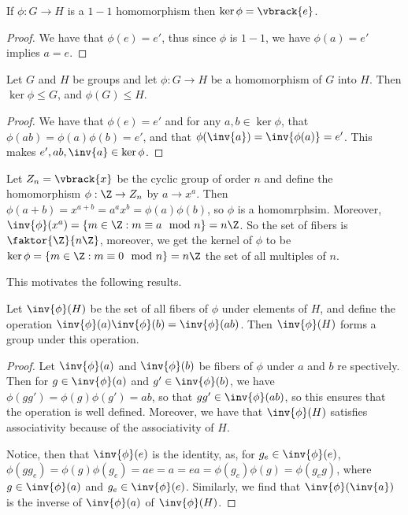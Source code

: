\begin{lemma}\label{3.1.1}
    If $\phi:G \rightarrow H$ is a $1-1$ homomorphism then $\ker{\phi}=\vbrack{e}$.
\end{lemma}
\begin{proof}
    We have that $\phi(e)=e'$, thus since $\phi$ is $1-1$, we have $\phi(a)=e'$
    implies $a=e$.
\end{proof}

\begin{lemma}\label{3.1.2}
    Let $G$ and  $H$ be groups and let  $\phi:G \rightarrow H$ be a homomorphism
    of $G$ into  $H$. Then $\ker{\phi} \leq G$, and $\phi(G) \leq H$.
\end{lemma}
\begin{proof}
    We have that $\phi(e)=e'$ and for any $a,b \in \ker{\phi}$, that
    $\phi(ab)=\phi(a)\phi(b)=e'$, and that $\phi(\inv{a})=\inv{\phi(a)}=e'$.
    This makes $e',ab, \inv{a} \in \ker{\phi}$.
\end{proof}

\begin{example}\label{3.1}
    Let $Z_n=\vbrack{x}$ be the cyclic group of order $n$ and define the
    homomorphism  $\phi:\Z \rightarrow Z_n$ by $a \rightarrow x^a$. Then
    $\phi(a+b)=x^{a+b}=a^ax^b=\phi(a)\phi(b)$, so $\phi$ is a homomrphsim.
    Moreover,  $\inv{\phi}(x^a)=\{m \in \Z : m \equiv a \mod{n}\}=n\Z$. So the
    set of fibers is $\faktor{\Z}{n\Z}$, moreover, we get the kernel of $\phi$
    to be  $\ker{\phi}=\{m \in \Z : m \equiv 0 \mod{n}\}=n\Z$ the set of all
    multiples of $n$.
\end{example}

This motivates the following results.

\begin{theorem}\label{3.1.3}
    Let $\inv{\phi}(H)$ be the set of all fibers of $\phi$ under elements of
    $H$, and define the operation $\inv{\phi}(a)\inv{\phi}(b)=\inv{\phi}(ab)$.
    Then $\inv{\phi}(H)$ forms a group under this operation.
\end{theorem}
\begin{proof}
    Let $\inv{\phi}(a)$ and $\inv{\phi}(b)$ be fibers of  $\phi$ under  $a$ and
     $b$ re spectively. Then for $g \in \inv{\phi}(a)$ and  $g' \in
     \inv{\phi}(b)$, we have  $\phi(gg')=\phi(g)\phi(g')=ab$, so that $gg' \in
     \inv{\phi}(ab)$, so this ensures that the operation is well defined.
     Moreover, we have that $\inv{\phi}(H)$ satisfies associativity because of
     the associativity of  $H$.

     Notice, then that  $\inv{\phi}(e)$ is the identity, as, for $g_e \in
     \inv{\phi}(e)$, $\phi(gg_e)=\phi(g)\phi(g_e)=ae=a=ea=\phi(g_e)\phi(g)=
     \phi(g_eg)$, where $g \in \inv{\phi}(a)$ and $g_e \in \inv{\phi}(e)$.
     Similarly, we find that $\inv{\phi}(\inv{a})$ is the inverse of $\inv{\phi}(a)$
     of $\inv{\phi}(H)$.
\end{proof}

